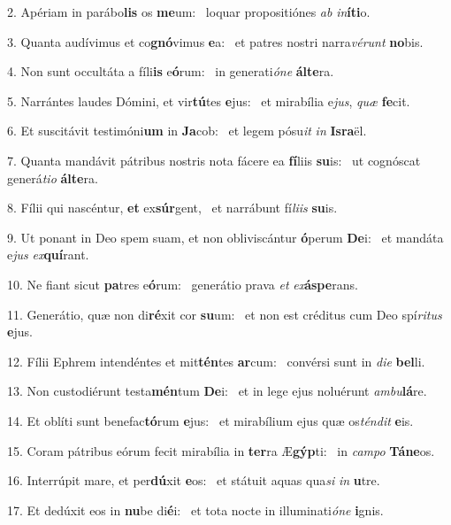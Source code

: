 2. Apériam in parábo\textbf{lis} os \textbf{me}um: \ast\  loquar propositiónes \textit{ab} \textit{in}\textbf{í}\textbf{ti}o.\

3. Quanta audívimus et co\textbf{gnó}vimus \textbf{e}a: \ast\  et patres nostri narra\textit{vé}\textit{runt} \textbf{no}bis.\

4. Non sunt occultáta a fíli\textbf{is} e\textbf{ó}rum: \ast\  in generati\textit{ó}\textit{ne} \textbf{ál}\textbf{te}ra.\

5. Narrántes laudes Dómini, et vir\textbf{tú}tes \textbf{e}jus: \ast\  et mirabília e\textit{jus}, \textit{quæ} \textbf{fe}cit.\

6. Et suscitávit testimóni\textbf{um} in \textbf{Ja}cob: \ast\  et legem pósu\textit{it} \textit{in} \textbf{Is}\textbf{ra}ël.\

7. Quanta mandávit pátribus nostris nota fácere ea \textbf{fí}liis \textbf{su}is: \ast\  ut cognóscat generá\textit{ti}\textit{o} \textbf{ál}\textbf{te}ra.\

8. Fílii qui nascéntur, \textbf{et} ex\textbf{súr}gent, \ast\  et narrábunt fí\textit{li}\textit{is} \textbf{su}is.\

9. Ut ponant in Deo spem suam, et non obliviscántur \textbf{ó}perum \textbf{De}i: \ast\  et mandáta e\textit{jus} \textit{ex}\textbf{quí}rant.\

10. Ne fiant sicut \textbf{pa}tres e\textbf{ó}rum: \ast\  generátio prava \textit{et} \textit{ex}\textbf{ás}\textbf{pe}rans.\

11. Generátio, quæ non di\textbf{ré}xit cor \textbf{su}um: \ast\  et non est créditus cum Deo spí\textit{ri}\textit{tus} \textbf{e}jus.\

12. Fílii Ephrem intendéntes et mit\textbf{tén}tes \textbf{ar}cum: \ast\  convérsi sunt in \textit{di}\textit{e} \textbf{bel}li.\

13. Non custodiérunt testa\textbf{mén}tum \textbf{De}i: \ast\  et in lege ejus noluérunt \textit{am}\textit{bu}\textbf{lá}re.\

14. Et oblíti sunt benefac\textbf{tó}rum \textbf{e}jus: \ast\  et mirabílium ejus quæ os\textit{tén}\textit{dit} \textbf{e}is.\

15. Coram pátribus eórum fecit mirabília in \textbf{ter}ra Æ\textbf{gýp}ti: \ast\  in \textit{cam}\textit{po} \textbf{Tá}\textbf{ne}os.\

16. Interrúpit mare, et per\textbf{dú}xit \textbf{e}os: \ast\  et státuit aquas qua\textit{si} \textit{in} \textbf{u}tre.\

17. Et dedúxit eos in \textbf{nu}be di\textbf{é}i: \ast\  et tota nocte in illuminati\textit{ó}\textit{ne} \textbf{i}gnis.\


